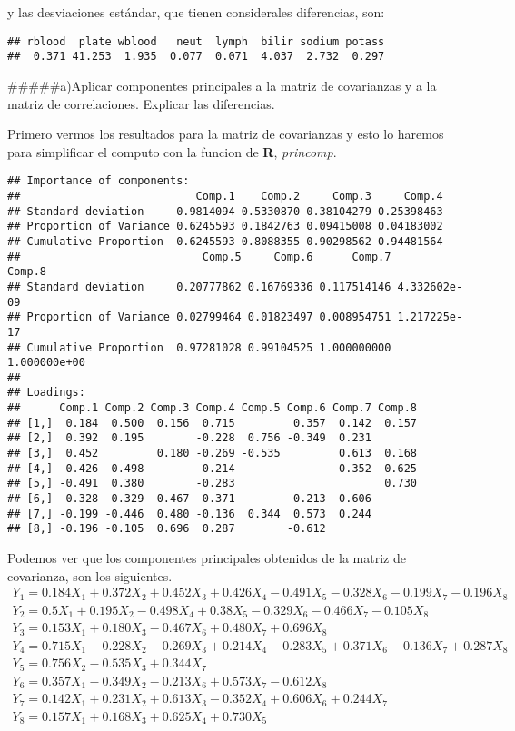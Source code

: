\documentclass[]{article}
\begin{document}
y las desviaciones estándar, que tienen considerales diferencias, son:

\begin{verbatim}
## rblood  plate wblood   neut  lymph  bilir sodium potass 
##  0.371 41.253  1.935  0.077  0.071  4.037  2.732  0.297
\end{verbatim}

\#\#\#\#\#a)Aplicar componentes principales a la matriz de covarianzas y
a la matriz de correlaciones. Explicar las diferencias.

Primero vermos los resultados para la matriz de covarianzas y esto lo
haremos para simplificar el computo con la funcion de \textbf{R},
\emph{princomp}.

\begin{verbatim}
## Importance of components:
##                           Comp.1    Comp.2     Comp.3     Comp.4
## Standard deviation     0.9814094 0.5330870 0.38104279 0.25398463
## Proportion of Variance 0.6245593 0.1842763 0.09415008 0.04183002
## Cumulative Proportion  0.6245593 0.8088355 0.90298562 0.94481564
##                            Comp.5     Comp.6      Comp.7       Comp.8
## Standard deviation     0.20777862 0.16769336 0.117514146 4.332602e-09
## Proportion of Variance 0.02799464 0.01823497 0.008954751 1.217225e-17
## Cumulative Proportion  0.97281028 0.99104525 1.000000000 1.000000e+00
## 
## Loadings:
##      Comp.1 Comp.2 Comp.3 Comp.4 Comp.5 Comp.6 Comp.7 Comp.8
## [1,]  0.184  0.500  0.156  0.715         0.357  0.142  0.157
## [2,]  0.392  0.195        -0.228  0.756 -0.349  0.231       
## [3,]  0.452         0.180 -0.269 -0.535         0.613  0.168
## [4,]  0.426 -0.498         0.214               -0.352  0.625
## [5,] -0.491  0.380        -0.283                       0.730
## [6,] -0.328 -0.329 -0.467  0.371        -0.213  0.606       
## [7,] -0.199 -0.446  0.480 -0.136  0.344  0.573  0.244       
## [8,] -0.196 -0.105  0.696  0.287        -0.612
\end{verbatim}

Podemos ver que los componentes principales obtenidos de la matriz de
covarianza, son los siguientes. \[\begin{array}{l}
Y_{1} =  0.184X_{1} + 0.372X_{2}+ 0.452X_{3} + 0.426X_{4} - 0.491X_{5} - 0.328X_{6} - 0.199X_{7} - 0.196X_{8}\\
Y_{2} =  0.5X_{1} + 0.195X_{2} - 0.498X_{4} + 0.38X_{5} - 0.329X_{6} - 0.466X_{7} - 0.105X_{8}\\
Y_{3} =  0.153X_{1} + 0.180X_{3} - 0.467X_{6} + 0.480X_{7} + 0.696X_{8}\\
Y_{4} =  0.715X_{1} - 0.228X_{2} - 0.269X_{3} + 0.214X_{4} - 0.283X_{5} + 0.371X_{6} - 0.136X_{7} + 0.287X_{8}\\
Y_{5} =  0.756X_{2} - 0.535X_{3} + 0.344X_{7} \\
Y_{6} =  0.357X_{1} - 0.349X_{2} - 0.213X_{6} + 0.573X_{7} - 0.612X_{8}\\
Y_{7} =  0.142X_{1} + 0.231X_{2} + 0.613X_{3} -  0.352X_{4} + 0.606X_{6} + 0.244X_{7}\\
Y_{8} =  0.157X_{1}  + 0.168X_{3} +  0.625X_{4} + 0.730X_{5}\\
\end{array}\]
\end{document}
